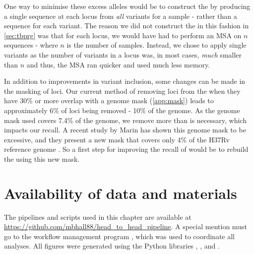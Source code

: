 One way to minimise these excess alleles would be to construct the \prg{} by producing a single sequence at each locus from \emph{all} variants for a sample - rather than a sequence for each variant. The reason we did not construct the \prg{} in this fashion in \autoref{sec:tbprg} was that for each locus, we would have had to perform an MSA on $n$ sequences - where $n$ is the number of samples. Instead, we chose to apply single variants as the number of variants in a locus was, in most cases, \emph{much} smaller than $n$ and thus, the MSA ran quicker and used much less memory.

In addition to improvements in variant inclusion, some changes can be made in the masking of loci. Our current method of removing loci from the \prg{} when they have 30\% or more overlap with a genome mask (\autoref{app:mask}) leads to approximately 6\% of loci being removed - 10\% of the genome. As the genome mask used covers 7.4\% of the genome, we remove more than is necessary, which impacts our recall. A recent study by Marin \etal{} has shown this genome mask to be excessive, and they present a new mask that covers only 4\% of the H37Rv reference genome \cite{marin2021}. So a first step for improving the recall of \pandora{} would be to rebuild the \prg{} using this new mask.


\section{Availability of data and materials}

The pipelines and scripts used in this chapter are available at \url{https://github.com/mbhall88/head_to_head_pipeline}. A special mention must go to the workflow management program  \cite{snakemake2021}, which was used to coordinate all analyses. All figures were generated using the Python libraries  \cite{matplotlib},  \cite{seaborn}, and  \cite{bokeh}.

